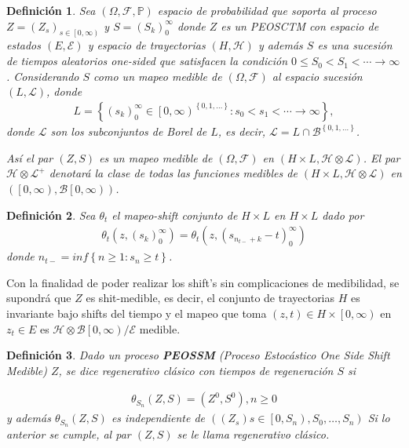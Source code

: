 \documentclass{article}
\newtheorem{Def}{Definición}
\newcommand{\prob}{\mathbb{P}}
\begin{document}
\begin{Def}
Sea $\left(\Omega,\mathcal{F},\prob\right)$ espacio de probabilidad que soporta al proceso $Z=\left(Z_{s}\right)_{s\in\left[0,\infty\right)}$ y $S=\left(S_{k}\right)_{0}^{\infty}$ donde $Z$ es un PEOSCTM con espacio de estados $\left(E,\mathcal{E}\right)$  y espacio de trayectorias $\left(H,\mathcal{H}\right)$  y adem\'as $S$ es una sucesi\'on de tiempos aleatorios one-sided que satisfacen la condici\'on $0\leq S_{0}<S_{1}<\cdots\rightarrow\infty$. Considerando $S$ como un mapeo medible de $\left(\Omega,\mathcal{F}\right)$ al espacio sucesi\'on $\left(L,\mathcal{L}\right)$, donde 
\begin{eqnarray*}
L=\left\{\left(s_{k}\right)_{0}^{\infty}\in\left[0,\infty\right)^{\left\{0,1,\ldots\right\}}:s_{0}<s_{1}<\cdots\rightarrow\infty\right\},
\end{eqnarray*}
donde $\mathcal{L}$ son los subconjuntos de Borel de $L$, es decir, $\mathcal{L}=L\cap\mathcal{B}^{\left\{0,1,\ldots\right\}}$.

As\'i el par $\left(Z,S\right)$ es un mapeo medible de  $\left(\Omega,\mathcal{F}\right)$ en $\left(H\times L,\mathcal{H}\otimes\mathcal{L}\right)$. El par $\mathcal{H}\otimes\mathcal{L}^{+}$ denotar\'a la clase de todas las funciones medibles de $\left(H\times L,\mathcal{H}\otimes\mathcal{L}\right)$ en $\left(\left[0,\infty\right),\mathcal{B}\left[0,\infty\right)\right)$.
\end{Def}


\begin{Def}
Sea $\theta_{t}$ el mapeo-shift conjunto de $H\times L$ en $H\times L$ dado por
\begin{eqnarray*}
\theta_{t}\left(z,\left(s_{k}\right)_{0}^{\infty}\right)=\theta_{t}\left(z,\left(s_{n_{t-}+k}-t\right)_{0}^{\infty}\right)
\end{eqnarray*}
donde 
$n_{t-}=inf\left\{n\geq1:s_{n}\geq t\right\}$.
\end{Def}

Con la finalidad de poder realizar los shift's sin complicaciones de medibilidad, se supondr\'a que $Z$ es shit-medible, es decir, el conjunto de trayectorias $H$ es invariante bajo shifts del tiempo y el mapeo que toma $\left(z,t\right)\in H\times\left[0,\infty\right)$ en $z_{t}\in E$ es $\mathcal{H}\otimes\mathcal{B}\left[0,\infty\right)/\mathcal{E}$ medible.

\begin{Def}
Dado un proceso \textbf{PEOSSM} (Proceso Estoc\'astico One Side Shift Medible) $Z$, se dice regenerativo cl\'asico con tiempos de regeneraci\'on $S$ si 

\begin{eqnarray*}
\theta_{S_{n}}\left(Z,S\right)=\left(Z^{0},S^{0}\right),n\geq0
\end{eqnarray*}
y adem\'as $\theta_{S_{n}}\left(Z,S\right)$ es independiente de $\left(\left(Z_{s}\right)s\in\left[0,S_{n}\right),S_{0},\ldots,S_{n}\right)$
Si lo anterior se cumple, al par $\left(Z,S\right)$ se le llama regenerativo cl\'asico.
\end{Def}
\end{document}
